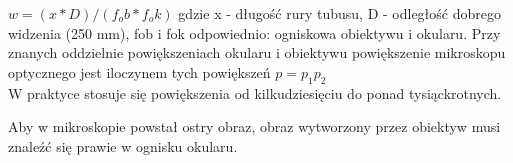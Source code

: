 \documentclass[a4paper,12pt]{scrbook} %
\begin{document}
$w = (x*D)/(f_ob*f_ok)$
gdzie x - długość rury tubusu, D - odległość dobrego widzenia (250 mm), fob i fok odpowiednio: ogniskowa obiektywu i okularu. Przy znanych oddzielnie powiększeniach okularu i obiektywu powiększenie mikroskopu optycznego jest iloczynem tych powiększeń $p = p_1p_2 $ \\W praktyce stosuje się powiększenia od kilkudziesięciu do ponad tysiąckrotnych.


Aby w mikroskopie powstał ostry obraz, obraz wytworzony przez obiektyw musi znaleźć się prawie w ognisku okularu.\\
\end{document}
